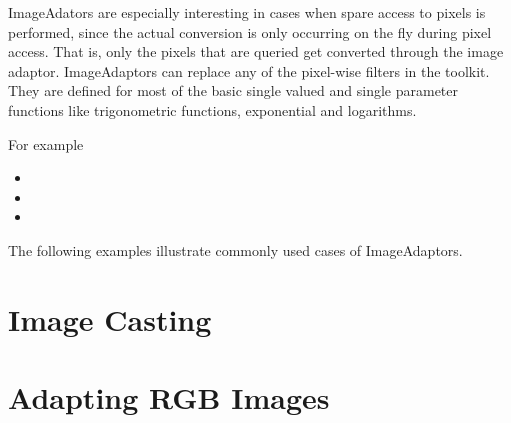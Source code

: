 ImageAdators are especially interesting in cases when spare access to pixels is
performed, since the actual conversion is only occurring on the fly during
pixel access. That is, only the pixels that are queried get converted through
the image adaptor.  ImageAdaptors can replace any of the pixel-wise filters in
the toolkit. They are defined for most of the basic single valued and single
parameter functions like trigonometric functions, exponential and logarithms.

For example

\begin{itemize}
\item {}
\item {}
\item {}
\end{itemize}

The following examples illustrate commonly used cases of ImageAdaptors.

\section{Image Casting}
\label{sec:ImageAdaptorForBasicCasting}
\ifitkFullVersion

\fi

\section{Adapting RGB Images}
\label{sec:ImageAdaptorForRGB}
\ifitkFullVersion

\fi


